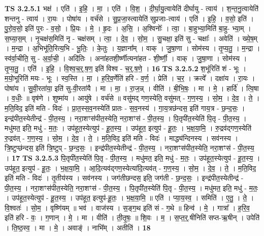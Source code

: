 \documentclass[17pt]{extarticle}
\begin{document}
                                \textbf{ TS 3.2.5.1} \newline
                  भक्ष॑ । एति॑ । इ॒हि॒ । मा॒ । एति॑ । वि॒श॒ । दी॒र्घा॒यु॒त्वायेति॑ दीर्घायु - त्वाय॑ । श॒न्त॒नु॒त्वायेति॑ शन्तनु - त्वाय॑ । रा॒यः । पोषा॑य । वर्च॑से । सु॒प्र॒जा॒स्त्वायेति॑ सुप्रजाः-त्वाय॑ । एति॑ । इ॒हि॒ । व॒सो॒ इति॑ । पु॒रो॒व॒सो॒ इति॑ पुरः - व॒सो॒ । प्रि॒यः । मे॒ । हृ॒दः । अ॒सि॒ । अ॒श्विनोः᳚ । त्वा॒ । बा॒हुभ्या॒मिति॑ बा॒हु- भ्या॒म् । स॒घ्या॒स॒म् । नृ॒चक्ष॑स॒मिति॑ नृ - चक्ष॑सम् । त्वा॒ । दे॒व॒ । सो॒म॒ । सु॒चक्षा॒ इति॑ सु - चक्षाः᳚ । अवेति॑ । ख्ये॒ष॒म् । म॒न्द्रा । अ॒भिभू॑ति॒रित्य॒भि - भू॒तिः॒ । के॒तुः । य॒ज्ञाना᳚म् । वाक् । जु॒षा॒णा । सोम॑स्य । तृ॒प्य॒तु॒ । म॒न्द्रा । स्व॑र्वा॒चीति॒ सु - अ॒र्वा॒ची॒ । अदि॑तिः । अना॑हतशी॒र्ष्णीत्यना॑हत - शी॒र्ष्णी॒ । वाक् । जु॒षा॒णा । सोम॑स्य । तृ॒प्य॒तु॒ । एति॑ । इ॒हि॒ । वि॒श्व॒च॒र्॒.ष॒ण॒ इति॑ विश्व - च॒र्॒.ष॒णे॒ । \textbf{  16} \newline
                  \newline
                                \textbf{ TS 3.2.5.2} \newline
                  श॒भूंरिति॑ शं - भूः । म॒यो॒भूरिति॑ मयः - भूः । स्व॒स्ति । मा॒ । ह॒रि॒व॒र्णेति॑ हरि - व॒र्ण॒ । प्रेति॑ । च॒र॒ । क्रत्वे᳚ । दक्षा॑य । रा॒यः । पोषा॑य । सु॒वी॒रता॑या॒ इति॑ सु-वी॒रता॑यै । मा । मा॒ । रा॒ज॒न्न् । वीति॑ । बी॒भि॒षः॒ । मा । मे॒ । हार्दि॑ । त्वि॒षा । व॒धीः॒ ॥ वृष॑णे । शुष्मा॑य । आयु॑षे । वर्च॑से ॥ वसु॑मद् गण॒स्येति॒ वसु॑मत् - ग॒ण॒स्य॒ । सो॒म॒ । दे॒व॒ । ते॒ । म॒ति॒विद॒ इति॑ मति - विदः॑ । प्रा॒त॒स्स॒व॒नस्येति॑ प्रातः - स॒व॒नस्य॑ । गा॒य॒त्रछ॑न्दस॒ इति॑ गाय॒त्र - छ॒न्द॒सः॒ । इन्द्र॑पीत॒स्येतीन्द्र॑ - पी॒त॒स्य॒ । नरा॒शꣳस॑पीत॒स्येति॒ नरा॒शꣳस॑ - पी॒त॒स्य॒ । पि॒तृपी॑त॒स्येति॑ पि॒तृ - पी॒त॒स्य॒ । मधु॑मत॒ इति॒ मधु॑ - म॒तः॒ । उप॑हूत॒स्येत्युप॑ - हू॒त॒स्य॒ । उप॑हूत॒ इत्युप॑ - हू॒तः॒ । भ॒क्ष॒या॒मि॒ । रु॒द्रव॑द्गण॒स्येति॑ रु॒द्रव॑त् - ग॒ण॒स्य॒ । सो॒म॒ । दे॒व॒ । ते॒ । म॒ति॒विद॒ इति॑ मति - विदः॑ । माद्ध्य॑न्दिनस्य । सव॑नस्य । त्रि॒ष्टुप्छ॑न्दस॒ इति॑ त्रि॒ष्टुप् - छ॒न्द॒सः॒ । इन्द्र॑पीत॒स्येतीन्द्र॑ - पी॒त॒स्य॒ । नरा॒शꣳस॑पीत॒स्येति॒ नरा॒शꣳस॑ - पी॒त॒स्य॒ । \textbf{  17} \newline
                  \newline
                                \textbf{ TS 3.2.5.3} \newline
                  पि॒तृपी॑त॒स्येति॑ पि॒तृ - पी॒त॒स्य॒ । मधु॑मत॒ इति॒ मधु॑ - म॒तः॒ । उप॑हूत॒स्येत्युप॑ - हू॒त॒स्य॒ । उप॑हूत॒ इत्युप॑ - हू॒तः॒ । भ॒क्ष॒या॒मि॒ । आ॒दि॒त्यव॑द्गण॒स्येत्या॑दि॒त्यव॑त् - ग॒ण॒स्य॒ । सो॒म॒ । दे॒व॒ । ते॒ । म॒ति॒विद॒ इति॑ मति - विदः॑ । तृ॒तीय॑स्य । सव॑नस्य । जग॑तीछन्दस॒ इति॒ जग॑ती - छ॒न्द॒सः॒ । इन्द्र॑पीत॒स्येतीन्द्र॑ - पी॒त॒स्य॒ । नरा॒शꣳस॑पीत॒स्येति॒ नरा॒शꣳस॑ - पी॒त॒स्य॒ । पि॒तृपी॑त॒स्येति॑ पि॒तृ - पी॒त॒स्य॒ । मधु॑मत॒ इति॒ मधु॑ - म॒तः॒ । उप॑हूत॒स्येत्युप॑ - हू॒त॒स्य॒ । उप॑हूत॒ इत्युप॑-हू॒तः॒ । भ॒क्ष॒या॒मि॒ ॥ एति॑ । प्या॒य॒स्व॒ । समिति॑ । ए॒तु॒ । ते॒ । वि॒श्वतः॑ । सो॒म॒ । वृष्णि॑यम् ॥ भव॑ । वाज॑स्य । स॒ङ्ग॒थ इति॑ सं - ग॒थे ॥ हिन्व॑ । मे॒ । गात्रा᳚ । ह॒रि॒व॒ इति॑ हरि - वः॒ । ग॒णान् । मे॒ । मा । वीति॑ । ती॒तृ॒षः॒ ॥ शि॒वः । म॒ । स॒प्त॒र्॒.षीनिति॑ सप्त-ऋ॒षीन् । उपेति॑ । ति॒ष्ठ॒स्व॒ । मा । मे॒ । अवाङ्॑ । नाभि᳚म् । अतीति॑ । \textbf{  18} \newline
\end{document}
